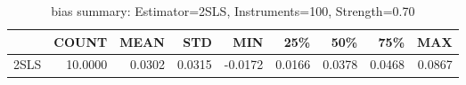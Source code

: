 \begin{table}[ht]
\centering
\caption{bias summary: Estimator=2SLS, Instruments=100, Strength=0.70}
\begin{tabular}{lrrrrrrrr}
\toprule
 & COUNT & MEAN & STD & MIN & 25\% & 50\% & 75\% & MAX \\
\midrule
2SLS & 10.0000 & 0.0302 & 0.0315 & -0.0172 & 0.0166 & 0.0378 & 0.0468 & 0.0867 \\
\bottomrule
\end{tabular}
\end{table}
